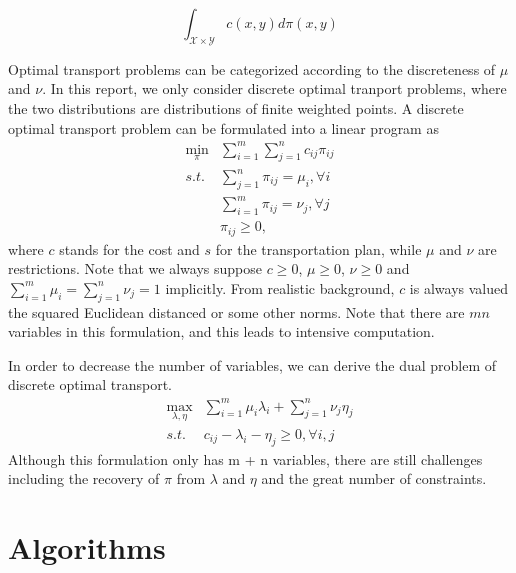 \documentclass{article}
\begin{document}
\begin{large}
\begin{equation}
\int_{ \mathcal{X} \times \mathcal{Y} } c ( x, y)  d \pi ( x, y ) 
\label{def}
\end{equation}

Optimal transport problems can be categorized according to the discreteness of $\mu$ and $\nu$. In this report, we only consider discrete optimal tranport problems, where the two distributions are distributions of finite weighted points.
A discrete optimal transport problem can be formulated into a linear program as
\begin{equation} \label{Eq:StdLP}
\begin{aligned}
\min_{\pi} & \sum_{i=1}^{m}\sum_{j=1}^{n} c_{ i j } \pi_{ i j }\\
s.t. & \sum_{j=1}^{n}\pi_{ i j } = \mu_i, \forall i\\
& \sum_{i=1}^{m}\pi_{ i j } = \nu_j, \forall j \\
& \pi_{ij} \geq 0,
\end{aligned}
\end{equation}
where $c$ stands for the cost and $s$ for the transportation plan, while $\mu$ and $\nu$ are restrictions. Note that we always suppose $ c \geq 0 $, $ \mu \geq 0 $, $ \nu \geq 0 $ and $ \sum_{i=1}^{m}{\mu_i} = \sum_{j=1}^{n}{\nu_j} = 1 $ implicitly. From realistic background, $c$ is always valued the squared Euclidean distanced or some other norms. Note that there are $ m n $ variables in this formulation, and this leads to intensive computation.

In order to decrease the number of variables, we can derive the dual problem of discrete optimal transport.
\begin{equation} \label{Eq:StdLP_dual}
  \begin{aligned}
  \max_{\lambda,\eta} & \sum_{i=1}^{m}\mu_{i}\lambda_{i}+\sum_{j=1}^{n}\nu_{j}\eta_{j}\\
  s.t. & c_{i j}-\lambda_{i}-\eta_{j}\geq0, \forall i, j
  \end{aligned}
\end{equation}
Although this formulation only has m + n variables, there are still challenges including the recovery of $\pi$ from $\lambda$ and $\eta$ and the great number of constraints.
\section{Algorithms}

\end{large}
\end{document}
